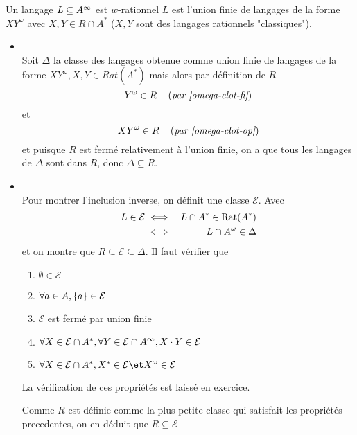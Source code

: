\begin{prop}
	Un langage $L \subseteq A^{\infty}$ est $w$-rationnel \ssi $L$ est l'union finie de langages
	de la forme $XY^{\omega}$ avec $X,Y \in R \cap A^*$ ($X,Y$ sont des langages rationnels "classiques").
\end{prop}

\begin{proofI}
	\begin{itemize}
		\item {} \\
		      Soit $\Delta$ la classe des langages obtenue comme union finie de langages de la forme $XY^{\omega}, X,Y \in Rat(A^*)$
		      mais alors par définition de $R$
		      $$Y^{\omega} \in R \quad\left(\textit{par \ref{omega-clot-fi}}\right)$$
		      et
		      $$XY^{\omega} \in R \quad\left(\textit{par \ref{omega-clot-op}}\right)$$
		      et puisque $R$ est fermé relativement à l'union finie, on a que tous les langages de $\Delta$ sont dans $R$,
		      donc $\Delta \subseteq R$.
		\item {} \\

		      Pour montrer l'inclusion inverse, on définit une classe $\mathcal{E}$.
		      Avec
		      \begin{eqnarray*}
			      L \in \mathcal{E} &\iff& L \cap A^* \in \text{Rat}(A^*) \\
			      &\iff& L \cap A^{\omega} \in \Delta
		      \end{eqnarray*}
		      et on montre que $R \subseteq \mathcal{E} \subseteq \Delta$.
		      Il faut vérifier que
		      \begin{enumerate}
			      \item $\emptyset \in \mathcal{E}$
			      \item $\forall a \in A, \left\{a\right\} \in  \mathcal{E}$
			      \item $\mathcal{E}$ est fermé par union finie

			      \item $\forall X \in \mathcal{E} \cap A^*, \forall Y \in \mathcal{E} \cap A^{\infty}, X \cdot Y \in \mathcal{E}$
			      \item $\forall X \in \mathcal{E} \cap A^*, X^* \in \mathcal{E} \et X^{\omega} \in \mathcal{E}$
		      \end{enumerate}
		      La vérification de ces propriétés est laissé en exercice.

		      Comme $R$ est définie comme la plus petite classe qui satisfait
		      les propriétés precedentes, on en déduit que $R \subseteq \mathcal{E}$
	\end{itemize}
\end{proofI}

